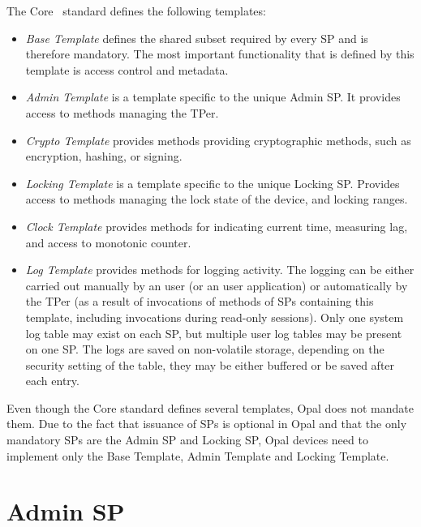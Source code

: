 The Core~\cite{tcg-storage-core} standard defines the following templates:
\begin{itemize}
\item \emph{Base Template} defines the shared subset required by every SP and is therefore mandatory. The most important functionality that is defined by this template is access control and metadata.
\item \emph{Admin Template} is a template specific to the unique Admin SP. It provides access to methods managing the TPer.
\item \emph{Crypto Template} provides methods providing cryptographic methods, such as encryption, hashing, or signing.
\item \emph{Locking Template} is a template specific to the unique Locking SP. Provides access to methods managing the lock state of the device, and locking ranges.
\item \emph{Clock Template} provides methods for indicating current time, measuring lag, and access to monotonic counter. 
\item \emph{Log Template} provides methods for logging activity. The logging can be either carried out manually by an user (or an user application) or automatically by the TPer (as a result of invocations of methods of SPs containing this template, including invocations during read-only sessions). 
Only one system log table may exist on each SP, but multiple user log tables may be present on one SP.
The logs are saved on non-volatile storage, depending on the security setting of the table, they may be either buffered or be saved after each entry.

\end{itemize}

Even though the Core standard defines several templates, Opal does not mandate them. Due to the fact that issuance of SPs is optional in Opal and that the only mandatory SPs are the Admin SP and Locking SP, Opal devices need to implement only the Base Template, Admin Template and Locking Template.



\section{Admin SP}
\label{admin_sp}

